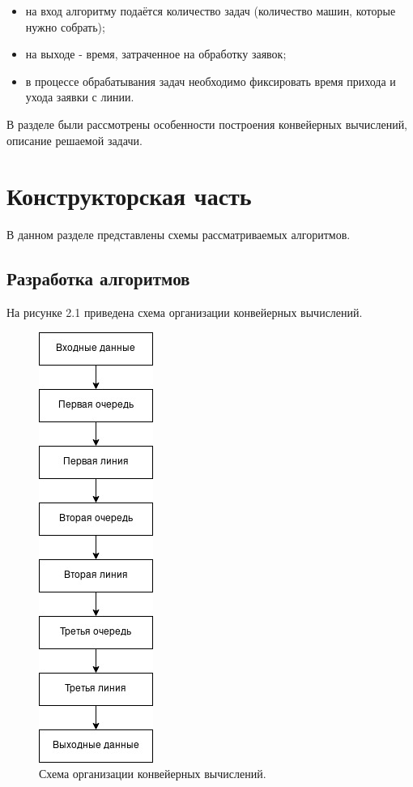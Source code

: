 \documentclass[12pt]{report}
\begin{document}
\begin{itemize}
	\item на вход алгоритму подаётся количество задач (количество машин, которые нужно собрать);
	\item на выходе - время, затраченное на обработку заявок;
	\item в процессе обрабатывания задач необходимо фиксировать время прихода и ухода заявки с линии.
\end{itemize}

В разделе были рассмотрены особенности построения конвейерных вычислений, описание решаемой задачи.

\chapter{Конструкторская часть}

В данном разделе представлены схемы рассматриваемых алгоритмов.

\section{Разработка алгоритмов}

На рисунке 2.1 приведена схема организации конвейерных вычислений.

\begin{figure}[h]
	\centering
	\includegraphics[scale=0.6]{scheme_lab05.jpg}
	\caption{Схема организации конвейерных вычислений.}
	\label{fig:mpr}
\end{figure}
\end{document}
